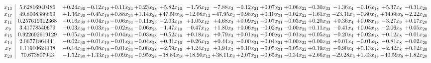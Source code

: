 \documentclass[9pt]{article}
\begin{document}
 \[\begin{array}{c| c c@{\hskip 2pt} c@{\hskip 2pt} c@{\hskip 2pt} c@{\hskip 2pt} c@{\hskip 2pt} c@{\hskip 2pt} c@{\hskip 2pt} c@{\hskip 2pt} c@{\hskip 2pt} c@{\hskip 2pt} c@{\hskip 2pt} c@{\hskip 2pt} c@{\hskip 2pt} c@{\hskip 2pt} c@{\hskip 2pt} }
 x_{13}   &  5.62816940486 & +  0.24 x_{30} & -0.12 x_{19} & +  0.11 x_{34} & +  0.23 x_{28} & +  5.82 x_{10} & -1.56 x_{12} & -7.88 x_{3} & -0.12 x_{21} & +  0.07 x_{31} & +  0.06 x_{22} & -0.30 x_{33} & -1.36 x_{4} & -0.16 x_{18} & +  5.37 x_{8} & -0.31 x_{20}\\
 x_{17}   &  49.8008386859 & +  1.36 x_{30} & -0.45 x_{19} & +  0.88 x_{34} & +  1.14 x_{28} & + 47.50 x_{10} & -12.08 x_{12} & -47.95 x_{3} & -0.98 x_{21} & +  0.10 x_{31} & -0.02 x_{22} & -1.61 x_{33} & -23.31 x_{4} & -0.80 x_{18} & + 34.68 x_{8} & -2.22 x_{20}\\
 x_{11}   &  0.257619312368 & -0.16 x_{30} & +  0.04 x_{19} & -0.06 x_{34} & -0.11 x_{28} & -2.93 x_{10} & +  1.05 x_{12} & +  4.68 x_{3} & +  0.09 x_{21} & -0.07 x_{31} & -0.03 x_{22} & +  0.20 x_{33} & +  0.36 x_{4} & +  0.08 x_{18} & -3.27 x_{8} & +  0.17 x_{20}\\
 x_{9}   &  3.41778540679 & -0.03 x_{30} & +  0.03 x_{19} & -0.02 x_{34} & -0.06 x_{28} & -1.47 x_{10} & -0.47 x_{12} & +  1.80 x_{3} & +  0.06 x_{21} & -0.02 x_{31} & -0.00 x_{22} & +  0.11 x_{33} & -0.41 x_{4} & +  0.04 x_{18} & -2.06 x_{8} & +  0.05 x_{20}\\
 x_{15}   &  0.922692619129 & -0.05 x_{30} & -0.01 x_{19} & +  0.04 x_{34} & -0.03 x_{28} & -0.52 x_{10} & +  0.18 x_{12} & +  0.79 x_{3} & +  0.01 x_{21} & -0.00 x_{31} & -0.01 x_{22} & +  0.05 x_{33} & -0.20 x_{4} & +  0.02 x_{18} & +  0.12 x_{8} & -0.01 x_{20}\\
 x_{14}   &  2.06771864441 & -0.02 x_{30} & +  0.01 x_{19} & -0.01 x_{34} & -0.04 x_{28} & +  0.31 x_{10} & -0.26 x_{12} & +  0.44 x_{3} & -0.00 x_{21} & -0.04 x_{31} & +  0.00 x_{22} & +  0.00 x_{33} & +  0.01 x_{4} & -0.01 x_{18} & -0.81 x_{8} & -0.02 x_{20}\\
 x_{7}   &  1.11910624138 & -0.14 x_{30} & +  0.08 x_{19} & -0.01 x_{34} & -0.08 x_{28} & -2.59 x_{10} & +  1.24 x_{12} & +  3.94 x_{3} & +  0.10 x_{21} & -0.05 x_{31} & -0.05 x_{22} & +  0.19 x_{33} & -0.90 x_{4} & +  0.13 x_{18} & -2.42 x_{8} & +  0.12 x_{20}\\
 x_{23}   &  70.673807943 & -1.52 x_{30} & +  1.33 x_{19} & +  0.09 x_{34} & -0.95 x_{28} & -38.84 x_{10} & + 18.90 x_{12} & + 38.11 x_{3} & +  2.07 x_{21} & -0.65 x_{31} & -0.34 x_{22} & +  2.66 x_{33} & -29.28 x_{4} & +  1.43 x_{18} & -40.59 x_{8} & +  1.82 x_{20}\\

\end{array}\]
\end{document}
